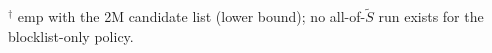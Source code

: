 $^{\dagger}$ emp with the 2M candidate list (lower bound); no all-of-$\tilde S$ run exists for the blocklist-only policy.
